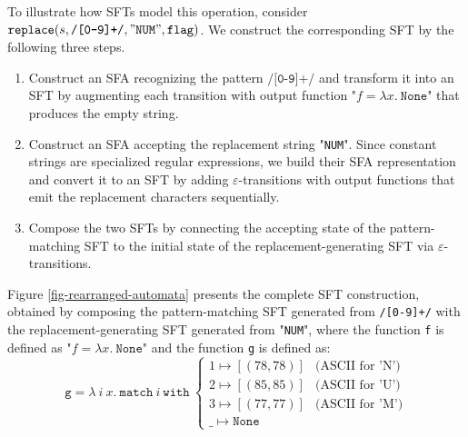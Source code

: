
To illustrate how SFTs model this operation, consider $\texttt{replace}(s, \texttt{/[0-9]+/}, "\texttt{NUM}", \texttt{flag})$. We construct the corresponding SFT by the following three steps.

\begin{enumerate}
  \item Construct an SFA recognizing the pattern $\texttt{/[0-9]+/}$ and transform it into an SFT by augmenting each transition with output function "$f = \lambda x.~\texttt{None}$" that produces the empty string.
  \item Construct an SFA accepting the replacement string "\texttt{NUM}". Since constant strings are specialized regular expressions, we build their SFA representation and convert it to an SFT by adding $\varepsilon$-transitions with output functions that emit the replacement characters sequentially.
  \item Compose the two SFTs by connecting the accepting state of the pattern-matching SFT to the initial state of the replacement-generating SFT via $\varepsilon$-transitions.
\end{enumerate}



Figure \ref{fig-rearranged-automata} presents the complete SFT construction, obtained by composing the pattern-matching SFT generated from \texttt{/[0-9]+/}  with the replacement-generating SFT generated from "\texttt{NUM}", where the function \texttt{f} is defined as "$f = \lambda x.~\texttt{None}$" and the function \texttt{g} is defined as:
\[
\texttt{g} = \lambda~i~x.~\texttt{match}~i~\texttt{with}~
\begin{cases}
1 \mapsto [(78, 78)] & \text{(ASCII for 'N')} \\
2 \mapsto [(85, 85)] & \text{(ASCII for 'U')} \\
3 \mapsto [(77, 77)] & \text{(ASCII for 'M')} \\
\_ \mapsto \texttt{None}
\end{cases}
\]

